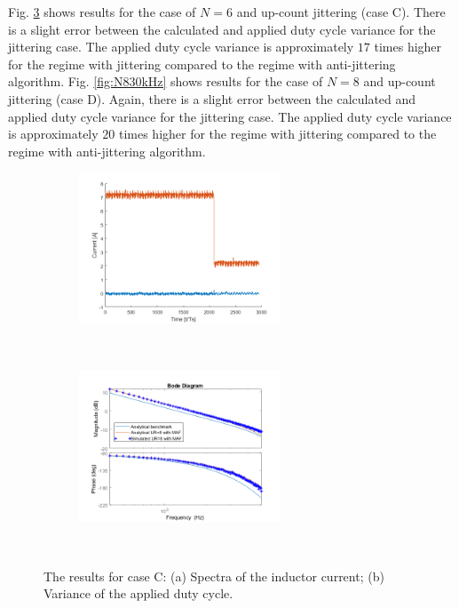 \documentclass[journal]{IEEEtran}
\begin{document}
Fig. \ref{fig:N630kHz} shows results for the case of $N=6$ and up-count jittering (case C). There is a slight error between the calculated and applied duty cycle variance for the jittering case. The applied duty cycle variance is approximately $17$ times higher for the regime with jittering compared to the regime with anti-jittering algorithm. Fig. \ref{fig:N830kHz} shows results for the case of $N=8$ and up-count jittering (case D). Again, there is a slight error between the calculated and applied duty cycle variance for the jittering case. The applied duty cycle variance is approximately $20$ times higher for the regime with jittering compared to the regime with anti-jittering algorithm.

\begin{figure}[t!]
\centering
\begin{subfigure}{0.5\textwidth}
  \centering
  \includegraphics[width=0.95\linewidth, height = 45mm]{figures/nasb_step.png}
  \caption{}
  \label{fig:N630kHz_sub1}
\end{subfigure}\\
\begin{subfigure}{0.5\textwidth}
  \centering
  \includegraphics[width=0.95\linewidth, height = 45mm]{figures/nasDif_ollfra.png}
  \caption{}
  \label{fig:N630kHz_sub2}
\end{subfigure}\\
\caption{The results for case C: (a) Spectra of the inductor current; (b) Variance of the applied duty cycle.}
\label{fig:N630kHz}
\end{figure}
\end{document}

